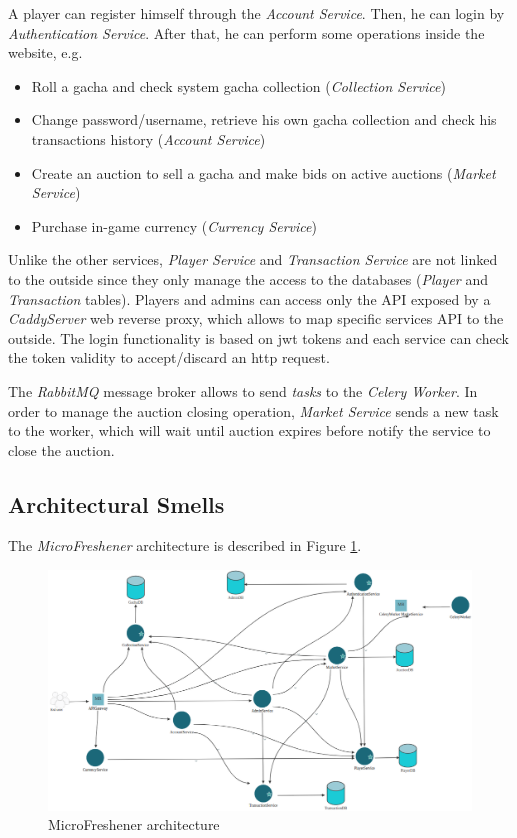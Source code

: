 \documentclass{article}
\begin{document}
A player can register himself through the \emph{Account Service}. Then, he can login by \emph{Authentication Service}. After that, he can perform some operations inside the website, e.g.
\begin{itemize}
    \item Roll a gacha and check system gacha collection (\emph{Collection Service})
    \item Change password/username, retrieve his own gacha collection and check his transactions history (\emph{Account Service})
    \item Create an auction to sell a gacha and make bids on active auctions (\emph{Market Service})
    \item Purchase in-game currency (\emph{Currency Service})
\end{itemize}
Unlike the other services, \emph{Player Service} and \emph{Transaction Service} are not linked to the outside since they only manage the access to the databases (\emph{Player} and \emph{Transaction} tables). Players and admins can access only the API exposed by a \emph{CaddyServer} web reverse proxy, which allows to map specific services API to the outside. The login functionality is based on jwt tokens and each service can check the token validity to accept/discard an http request.

The \emph{RabbitMQ} message broker allows to send \emph{tasks} to the \emph{Celery Worker}. In order to manage the auction closing operation, \emph{Market Service} sends a new task to the worker, which will wait until auction expires before notify the service to close the auction.

\subsection{Architectural Smells}
The \emph{MicroFreshener} architecture is described in Figure \ref{fig:microfreshener_architecture}.
\begin{figure}[ht!]
    \centering
    \includegraphics[width=12cm]{microFreshenerArchitecture.png}
    \caption{MicroFreshener architecture}
    \label{fig:microfreshener_architecture}
\end{figure}
\end{document}
